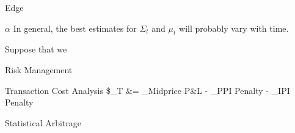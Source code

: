 \documentclass{beamer}
\begin{document}
\begin{frame}{Edge}

\end{frame}

\begin{frame}{$\alpha$}
	In general, the best estimates for $\Sigma_t$ and $\mu_t$ will probably vary with time.

	Suppose that we 


\end{frame}

\begin{frame}{Risk Management}

\end{frame}

\begin{frame}{Transaction Cost Analysis}
	\$\Pi_T	&= _{\textrm{Midprice P\&L}} - _{\textrm{PPI Penalty}} - _{\textrm{IPI Penalty}}
\end{frame}

\begin{frame}{Statistical Arbitrage}
\end{frame}
\end{document}
